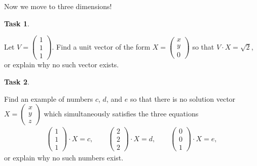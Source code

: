 \documentclass[10pt,]{book}
\theoremstyle{plain}
\theoremstyle{definition}
\numberwithin{equation}{section}
\newtheorem{task}{Task}[chapter]
\begin{document}
Now we move to three dimensions!%
\begin{task}
\label{task-20}

        Let \(V = \left(\begin{smallmatrix}1\\1\\1\end{smallmatrix}\right)\).
        Find a unit vector of the form \(X = \left(\begin{smallmatrix}x\\y\\0
        \end{smallmatrix}\right)\) so that \(V\cdot X = \sqrt{2}\), or explain
        why no such vector exists.
      \end{task}
\begin{task}
\label{task-21}

        Find an example of numbers \(c\), \(d\), and \(e\) so that there
        is no solution vector \(X = \left(\begin{smallmatrix}x\\y\\z
        \end{smallmatrix}\right)\) which simultaneously satisfies the three
        equations \begin{gather*}
\begin{pmatrix} 1\\1\\1\end{pmatrix}\cdot X = c, \qquad
          \begin{pmatrix} 2\\2\\2\end{pmatrix}\cdot X = d, \qquad
          \begin{pmatrix} 0\\0\\1\end{pmatrix}\cdot X = e,
\end{gather*}
          or explain why no such numbers exist.
      \end{task}
\end{document}
